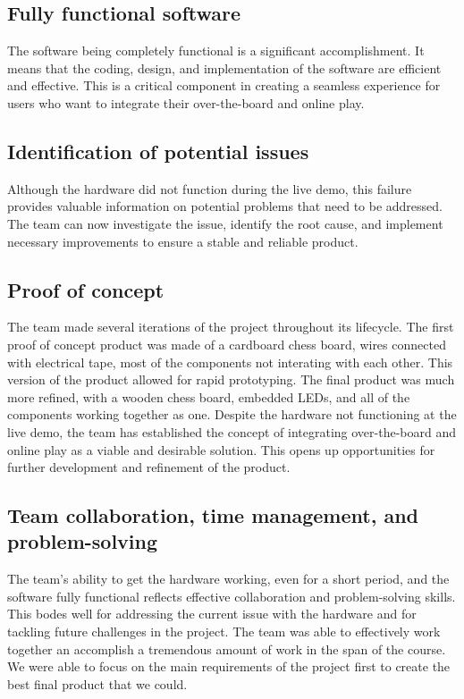 \documentclass{article}
\begin{document}
\subsection{Fully functional software}
The software being completely functional is a significant accomplishment. It means that the coding, design, and implementation of the software are efficient and effective. This is a critical component in creating a seamless experience for users who want to integrate their over-the-board and online play.

\subsection{Identification of potential issues}
Although the hardware did not function during the live demo, this failure provides valuable information on potential problems that need to be addressed. The team can now investigate the issue, identify the root cause, and implement necessary improvements to ensure a stable and reliable product.

\subsection{Proof of concept}
The team made several iterations of the project throughout its lifecycle. The first proof of concept product was made of a cardboard chess board, wires connected with electrical tape, most of the components not interating with each other. This version of the product allowed
for rapid prototyping. The final product was much more refined, with a wooden chess board, embedded LEDs, and all of the components working together as one.
Despite the hardware not functioning at the live demo, the team has established the concept of integrating over-the-board and online play as a viable and desirable solution. This opens up opportunities for further development and refinement of the product.


\subsection{Team collaboration, time management, and problem-solving}
The team's ability to get the hardware working, even for a short period, and the software fully functional reflects effective collaboration and problem-solving skills. This bodes well for addressing the current issue with the hardware and for tackling future challenges in the project.
The team was able to effectively work together an accomplish a tremendous amount of work in the span of the course. We were able to focus on the main requirements of the project first to create the best final product that we could.
\end{document}

